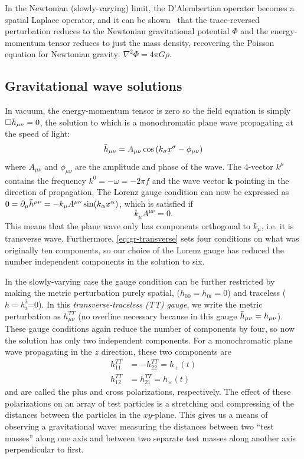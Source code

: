 In the Newtonian (slowly-varying) limit, the D'Alembertian operator becomes a spatial Laplace operator, and it can be shown~\citep{Creighton_2011} that the trace-reversed perturbation reduces to the Newtonian gravitational potential $\Phi$ and the energy-momentum tensor reduces to just the mass density, recovering the Poisson equation for Newtonian gravity: $\nabla^2\Phi = 4\pi G\rho$.


\subsection{Gravitational wave solutions}

In vacuum, the energy-momentum tensor is zero so the field equation is simply $\Box\Bar{h}_{\mu\nu}=0$, the solution to which is a monochromatic plane wave propagating at the speed of light:
\begin{equation}
	\Bar{h}_{\mu\nu} = A_{\mu\nu}\cos\left(k_\sigma x^\sigma - \phi_{\mu\nu}\right)
\end{equation}
where $A_{\mu\nu}$ and $\phi_{\mu\nu}$ are the amplitude and phase of the wave.
The 4-vector $k^{\mu}$ contains the frequency $k^0 = -\omega = -2\pi f$ and the wave vector $\mathbf{k}$ pointing in the direction of propagation.
The Lorenz gauge condition can now be expressed as $0 = \partial_{\mu} \Bar{h}^{\mu\nu} = -k_{\mu} A^{\mu\nu} \sin (k_{\alpha} x^{\alpha})$, which is satisfied if
\begin{equation}\label{eq:gr-transverse}
	k_{\mu} A^{\mu\nu} = 0.
\end{equation}
This means that the plane wave only has components orthogonal to $k_{\mu}$, i.e. it is transverse wave.
Furthermore, \cref{eq:gr-transverse} sets four conditions on what was originally ten components, so our choice of the Lorenz gauge has reduced the number independent components in the solution to six.

In the slowly-varying case the gauge condition can be further restricted by making the metric perturbation purely spatial, ($h_{00}=h_{0i}=0$) and traceless ($h=h_i^i$=0).
In this \textit{transverse-traceless (TT) gauge}, we write the metric perturbation as $h_{\mu\nu}^{TT}$ (no overline necessary because in this gauge $\Bar{h}_{\mu\nu} = h_{\mu\nu}$).
These gauge conditions again reduce the number of components by four, so now the solution has only two independent components.
For a monochromatic plane wave propagating in the $z$ direction, these two components are
\begin{align}
	h_{11}^{TT} &= -h_{22}^{TT} = h_+(t) \\
	h_{12}^{TT} &= h_{21}^{TT} = h_{\times}(t)
\end{align}
and are called the plus and cross polarizations, respectively.
The effect of these polarizations on an array of test particles is a stretching and compressing of the distances between the particles in the $xy$-plane.
This gives us a means of observing a gravitational wave:
measuring the distances between two ``test masses'' along one axis and between two separate test masses along another axis perpendicular to first.

